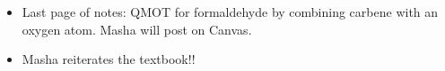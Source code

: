 \documentclass[../notes.tex]{subfiles}
\begin{document}
\begin{itemize}
\begin{itemize}
\begin{itemize}
\begin{itemize}
                \item Triplet is \ang{136}, and singlet is \ang{105}, so the triplet is more linear and the singlet is more bent! The triplet has reactivity more characteristic of the linear orbital picture, and the singlet has reactivity more characteristic of the bent orbital picture.
                \item The triplet is more favored by \SI[per-mode=symbol]{9}{\kilo\calorie\per\mole}
            \end{itemize}
        \end{itemize}
    \end{itemize}
    \item Last page of notes: QMOT for formaldehyde by combining carbene with an oxygen atom. Masha will post on Canvas.
    \item Masha reiterates the textbook!!
\end{itemize}
\end{document}
